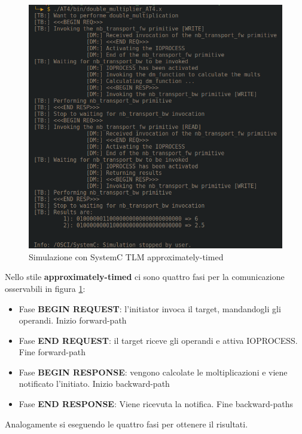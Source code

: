 \documentclass[]{IEEEtran}
\begin{document}
\begin{figure}[!htb]
    \centering
    \includegraphics[width=\linewidth]{figures/SIM_TLM_AT4.png}
    \caption{Simulazione con SystemC TLM approximately-timed}
    \label{fig:SIM_TLM_AT4}
\end{figure}
Nello stile \textbf{approximately-timed} ci sono quattro fasi per la comunicazione osservabili in figura \ref{fig:SIM_TLM_AT4}:
\begin{itemize}
    \item Fase \textbf{BEGIN REQUEST}: l'initiator invoca il target, mandandogli gli operandi. Inizio forward-path
    \item Fase \textbf{END REQUEST}: il target riceve gli operandi e attiva IOPROCESS. Fine forward-path
    \item Fase \textbf{BEGIN RESPONSE}: vengono calcolate le moltiplicazioni e viene notificato l'initiato. Inizio backward-path
    \item Fase \textbf{END RESPONSE}: Viene ricevuta la notifica. Fine backward-paths
\end{itemize}
Analogamente si eseguendo le quattro fasi per ottenere il risultati.
\end{document}
